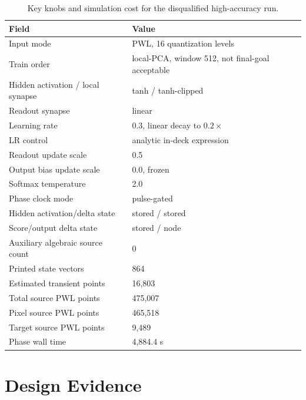 \documentclass[11pt]{article}
\begin{document}
\begin{table}[H]
  \centering
  \caption{Key knobs and simulation cost for the disqualified high-accuracy
  run.}
  \label{tab:cost}
  \begin{tabular}{ll}
    \toprule
    Field & Value \\
    \midrule
    Input mode & PWL, 16 quantization levels \\
    Train order & local-PCA, window 512, not final-goal acceptable \\
    Hidden activation / local synapse & tanh / tanh-clipped \\
    Readout synapse & linear \\
    Learning rate & 0.3, linear decay to \(0.2\times\) \\
    LR control & analytic in-deck expression \\
    Readout update scale & 0.5 \\
    Output bias update scale & 0.0, frozen \\
    Softmax temperature & 2.0 \\
    Phase clock mode & pulse-gated \\
    Hidden activation/delta state & stored / stored \\
    Score/output delta state & stored / node \\
    Auxiliary algebraic source count & 0 \\
    Printed state vectors & 864 \\
    Estimated transient points & 16,803 \\
    Total source PWL points & 475,007 \\
    Pixel source PWL points & 465,518 \\
    Target source PWL points & 9,489 \\
    Phase wall time & 4,884.4 s \\
    \bottomrule
  \end{tabular}
\end{table}

\section{Design Evidence}
\end{document}
